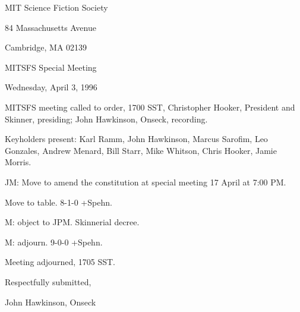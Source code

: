\documentclass[12pt]{article}
\begin{document}
\begin{center}

MIT Science Fiction Society 

84 Massachusetts Avenue

Cambridge, MA 02139

\vspace{12pt}

MITSFS Special Meeting

Wednesday, April 3, 1996

\end{center}
 
\vspace{18pt}

\setlength{\parskip}{6pt}

\noindent
MITSFS meeting called to order, 1700 SST,
Christopher Hooker, President and Skinner, presiding; John Hawkinson, Onseck, recording.

Keyholders present: Karl Ramm, John Hawkinson, Marcus Sarofim, Leo Gonzales, Andrew Menard, Bill Starr, Mike Whitson, Chris Hooker, Jamie Morris.

JM: Move to amend the constitution at special meeting 17 April at 7:00 PM.

Move to table. 8-1-0 +Spehn.

M: object to JPM. Skinnerial decree.

M: adjourn. 9-0-0 +Spehn.

\vspace{12pt}

\noindent
Meeting adjourned, 1705 SST.

\vspace{18pt}

\centerline{Respectfully submitted,}
\centerline{John Hawkinson, Onseck}
\end{document}
